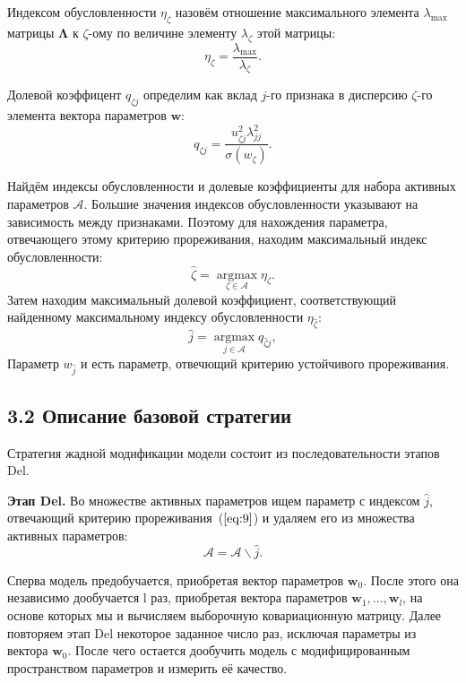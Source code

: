 \documentclass[12pt]{article}
\begin{document}
Индексом обусловленности $\eta_{\zeta}$ назовём отношение максимального элемента $\lambda_{\max}$ матрицы $\mathbf{\Lambda}$ к ${\zeta}$-ому по величине элементу $\lambda_{\zeta}$ этой матрицы:
\begin{equation*}
\eta_{\zeta} = \frac{\lambda_{\max}}{\lambda_{\zeta}}.
\end{equation*}

Долевой коэффицент $q_{{\zeta}j}$ определим как вклад $j$-го признака в дисперсию ${\zeta}$-го элемента вектора параметров $\mathbf{w}$:
\begin{equation*}
q_{{\zeta}j} = \frac {u_{{\zeta}j}^2\lambda_{jj}^2}{\sigma(w_{\zeta})}.
\end{equation*}

Найдём индексы обусловленности и долевые коэффициенты для набора активных параметров $\mathcal{A}$. Большие значения индексов обусловленности указывают на зависимость между признаками. Поэтому для нахождения параметра, отвечающего этому критерию прореживания, находим максимальный индекс обусловленности:
\begin{equation*}
\hat{{\zeta}} = \mathop{\text{argmax}}\limits_{{{\zeta} \in \mathcal{A}}}\eta_{\zeta}.
\end{equation*}
Затем находим максимальный долевой коэффициент, соответствующий найденному максимальному индексу обусловленности $\eta_{\hat{{\zeta}}}$:
\begin{equation}
\label{eq:9}
\hat{j} = \mathop{\text{argmax}}\limits_{{j \in \mathcal{A}}}q_{\hat{{\zeta}}j},
\end{equation}
Параметр $w_{\hat{j}}$ и есть параметр, отвечющий критерию устойчивого прореживания.

\subsection{3.2 Описание базовой стратегии}
Стратегия жадной модификации модели состоит из последовательности этапов Del.

\textbf{Этап Del.} Во множестве активных параметров ищем параметр с индексом $\hat{j}$, отвечающий критерию прореживания~($\ref{eq:9}$) и удаляем его из множества активных параметров:
\begin{equation*}
\mathcal{A} = \mathcal{A} \backslash \hat{j}.
\end{equation*}

Сперва модель предобучается, приобретая вектор параметров $\mathbf{w}_{0}$. После этого она независимо дообучается l раз, приобретая вектора параметров $\mathbf{w}_{1},...,\mathbf{w}_{l}$, на основе которых мы и вычисляем выборочную ковариационную матрицу. Далее повторяем этап Del некоторое заданное число раз, исключая параметры из вектора $\mathbf{w}_{0}$. После чего остается дообучить модель с модифицированным пространством параметров и измерить её качество.
\end{document}
